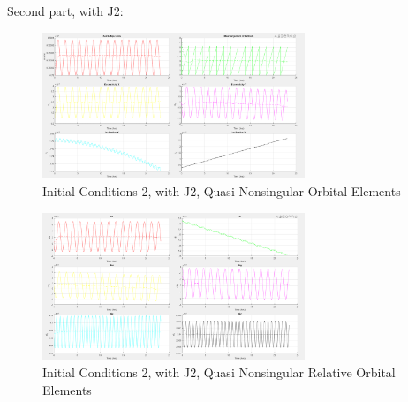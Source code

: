 Second part, with J2:
\begin{figure}[H]
    \centering
    \includegraphics[width=0.7\textwidth]{PS4/Figures/case2_J2.png}
    \caption{Initial Conditions 2, with J2, Quasi Nonsingular Orbital Elements}
    \label{fig:hcw_velocity}
\end{figure}
\begin{figure}[H]
    \centering
    \includegraphics[width=0.7\textwidth]{PS4/Figures/case2_J2_2.png}
    \caption{Initial Conditions 2, with J2, Quasi Nonsingular Relative Orbital Elements}
    \label{fig:hcw_velocity}
\end{figure}

